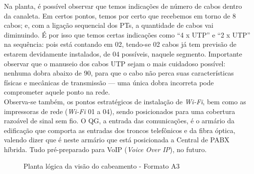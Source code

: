 \documentclass[	DIV=calc,%
							paper=a4,%
							fontsize=12pt,%
							onecolumn]{scrartcl}	 					%
\begin{document}
Na planta, é possível observar que temos indicações de número de cabos dentro da canaleta. Em certos pontos, temos por certo que recebemos em torno de 8 cabos; e, com a ligação sequencial dos PTs, a quantidade de cabos vai diminuindo. É por isso que temos certas indicações como ``4 x UTP'' e ``2 x UTP'' na sequência: pois está contando em 02, tendo-se 02 cabos já tem previsão de estarem devidamente instalados, de 04 possíveis, naquele segmento. Importante observar que o manuseio dos cabos UTP sejam o mais cuidadoso possível: nenhuma dobra abaixo de 90, para que o cabo não perca suas características físicas e mecânicas de transmissão --- uma única dobra incorreta pode comprometer aquele ponto na rede. 
\\

Observa-se também, os pontos estratégicos de instalação de \textit{Wi-Fi}, bem como as impressoras de rede (\textit{Wi-Fi} 01 a 04), sendo posicionados para uma cobertura razoável de sinal sem fio. O QG, a entrada das comunicações, é o armário da edificação que comporta as entradas dos troncos telefônicos e da fibra óptica, valendo dizer que é neste armário que está posicionada a Central de PABX híbrida. Tudo pré-preparado para VoIP (\textit{Voice Over IP}), no futuro.




\clearpage
\thispagestyle{plain}

\recalctypearea

\begin{figure}
	\noindent{}
	\caption{Planta lógica da visão do cabeamento - Formato A3}
	\label{fig2}
\end{figure}
\end{document}
